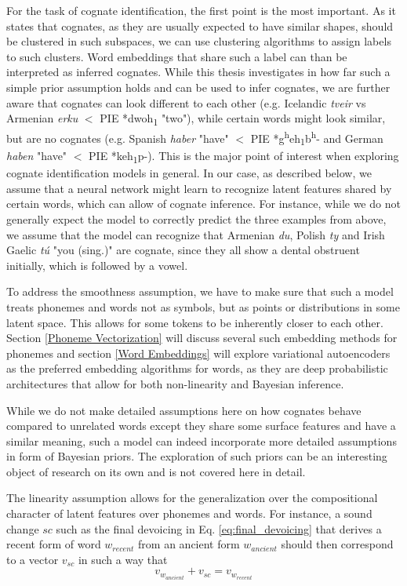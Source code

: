 \documentclass[6pt]{article}
\begin{document}
For the task of cognate identification, the first point is the most important. As it states that cognates, as they are usually expected to have similar shapes, should be clustered in such subspaces, we can use clustering algorithms to assign labels to such clusters. Word embeddings that share such a label can than be interpreted as inferred cognates. While this thesis investigates in how far such a simple prior assumption holds and can be used to infer cognates, we are further aware that cognates can look different to each other (e.g. Icelandic \textit{tveir} vs Armenian \textit{erku} $<$ PIE *dwoh\textsubscript{1} "two"), while certain words might look similar, but are no cognates (e.g. Spanish \textit{haber} "have" $<$ PIE *g\textsuperscript{h}eh\textsubscript{1}b\textsuperscript{h}- and German \textit{haben} "have" $<$ PIE *keh\textsubscript{1}p-). This is the major point of interest when exploring cognate identification models in general. In our case, as described below, we assume that a neural network might learn to recognize latent features shared by certain words, which can allow of cognate inference. For instance, while we do not generally expect the model to correctly predict the three examples from above, we assume that the model can recognize that Armenian \textit{du}, Polish \textit{ty} and Irish Gaelic \textit{tú} "you (sing.)" are cognate, since they all show a dental obstruent initially, which is followed by a vowel. 

To address the smoothness assumption, we have to make sure that such a model treats phonemes and words not as symbols, but as points or distributions in some latent space. This allows for some tokens to be inherently closer to each other. Section \ref{Phoneme Vectorization} will discuss several such embedding methods for phonemes and section \ref{Word Embeddings} will explore variational autoencoders \citep{kingma2013auto} as the preferred embedding algorithms for words, as they are deep probabilistic architectures that allow for both non-linearity and Bayesian inference. 

While we do not make detailed assumptions here on how cognates behave compared to unrelated words except they share some surface features and have a similar meaning, such a model can indeed incorporate more detailed assumptions in form of Bayesian priors. The exploration of such priors can be an interesting object of research on its own and is not covered here in detail.

The linearity assumption allows for the generalization over the compositional character of latent features over phonemes and words. For instance, a sound change $sc$ such as the final devoicing in Eq. \ref{eq:final_devoicing} that derives a recent form of word $w_{recent}$ from an ancient form  $w_{ancient}$ should then correspond to a vector $v_{sc}$ in such a way that 
\begin{equation}
\label{eq:sound_change_linear_dependency}
v_{w_{ancient}}+v_{sc} = v_{w_{recent}}
\end{equation}
\end{document}
